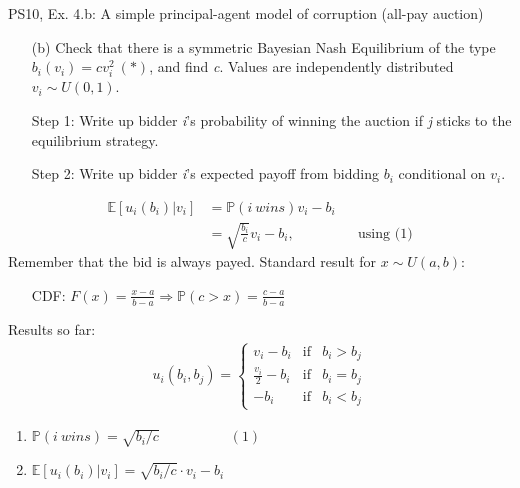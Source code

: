 \begin{frame}{PS10, Ex. 4.b: A simple principal-agent model of corruption (all-pay auction)}
    \begin{itemize}
      \item[(b)] Check that there is a symmetric Bayesian Nash Equilibrium of the type $b_i(v_i) = cv_i^2\ (*)$, and find \textit{c}. Values are independently distributed $v_i\sim U(0, 1)$.
    \end{itemize} \vspace{-8pt}
    \begin{multicols}{2}
      \begin{itemize}
        \item[Step 1:] Write up bidder \textit{i}'s probability of winning the auction if \textit{j} sticks to the equilibrium strategy.
        \item[Step 2:] Write up bidder \textit{i}'s expected payoff from bidding $b_i$ conditional on $v_i$.
      \end{itemize} \vspace{-8pt}
      \begin{align*}
        \mathbb{E}[u_i(b_i)|v_i]&=\mathbb{P}(i\ wins)v_i-b_i\\
                           &=\sqrt{\frac{b_i}{c}}v_i-b_i,&&\text{using (1)}
      \end{align*} \vspace{-8pt}
      Remember that the bid is always payed.
      \vfill\null\columnbreak
      Standard result for $x\sim U(a, b):$ \vspace{-6pt}
      \begin{itemize}
        \item[CDF:] $F(x)=\frac{x-a}{b-a}\Rightarrow\mathbb{P}(c>x)=\frac{c-a}{b-a}$
      \end{itemize}
      \vspace{-6pt}
      Results so far: \vspace{-6pt}
      \begin{align*}
        u_i(b_i,b_j)=\left\{\begin{array}{lcl}
          v_i-b_i           & \text{if} & b_i>b_j \\
          \frac{v_i}{2}-b_i & \text{if} & b_i=b_j \\
          -b_i              & \text{if} & b_i<b_j
        \end{array}\right.
      \end{align*} \vspace{-16pt}
      \begin{enumerate}
        \item $\mathbb{P}(i\ wins)=\sqrt{b_i/c}\quad\quad\quad\quad\quad(1)$
        \item $\mathbb{E}[u_i(b_i)|v_i]=\sqrt{b_i/c}\cdot v_i-b_i$
      \end{enumerate}
      \vfill\null
    \end{multicols}
\end{frame}
